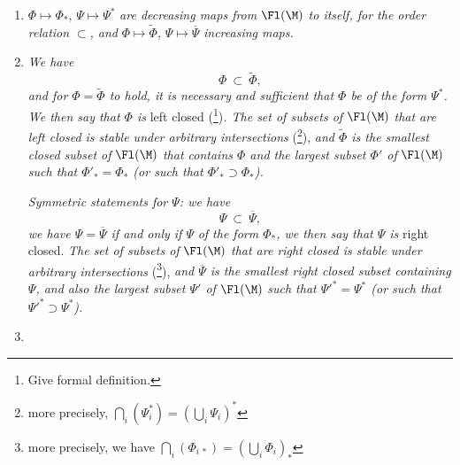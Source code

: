 \begin{enumerate}[label={}]
\item[a)] $\Phi \longmapsto \Phi_*$, $\Psi \longmapsto \Psi^*$ \textit{are decreasing maps from} $\Fl(\M)$ \textit{to itself, for the order relation} $\subset$\textit{, and} $\Phi \longmapsto \widetilde{\Phi}$\textit{,} $\Psi \longmapsto \overline{\Psi}$ \textit{increasing maps.}


\item[b)] \textit{We have}
\[
\Phi\ \subset\ \widetilde{\Phi},
\]
\textit{and for $\Phi = \widetilde{\Phi}$ to hold, it is necessary and sufficient that $\Phi$ be of the form $\Psi^*$. We then say that $\Phi$ is} \textup{left closed} (\footnote[2]{Give formal definition.})\textit{. The set of subsets of} $\Fl(\M)$ \textit{that are left closed is stable under arbitrary intersections} (\footnote[3]{more precisely, $\bigcap_i(\Psi_i^*) = (\bigcup_i \Psi_i)^*$}), \textit{and $\widetilde{\Phi}$ is the smallest closed subset of} $\Fl(\M)$ \textit{that contains $\Phi$ and the largest subset $\Phi'$ of} $\Fl(\M)$ \textit{such that $\Phi'_* = \Phi_*$ (or such that $\Phi'_* \supset \Phi_*$).}

\textit{Symmetric statements for $\Psi$: we have}
\[
\Psi\ \subset\ \overline{\Psi},
\]
\textit{we have $\Psi = \overline{\Psi}$ if and only if $\Psi$} \textit{of the form $\Phi_*$, we then say that $\Psi$ is} \textup{right closed.} \textit{The set of subsets of} $\Fl(\M)$ \textit{that are right closed is stable under arbitrary intersections} (\footnote[4]{more precisely, we have $\bigcap_i(\Phi_{i\,*}) = (\bigcup_i \Phi_i)_*$}), \textit{and $\overline{\Psi}$ is the smallest right closed subset containing $\Psi$, and also the largest subset $\Psi'$ of} $\Fl(\M)$ \textit{such that $\Psi'^* = \Psi^*$ (or such that $\Psi'^* \supset \Psi^*$).}

\item[] \hspace*{-2.5em}


\end{enumerate}
